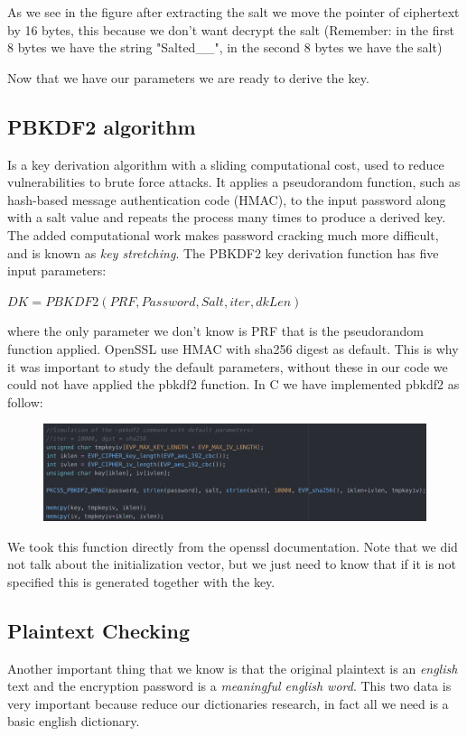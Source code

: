\documentclass[11pt]{article}
\begin{document}
As we see in the figure after extracting the salt we move the pointer of ciphertext by 16 bytes, this because we don't want decrypt the salt (Remember: in the first 8 bytes we have the string "Salted\_\_", in the second 8 bytes we have the salt)

Now that we have our parameters we are ready to derive the key.

\subsection{PBKDF2 algorithm}
Is a key derivation algorithm with a sliding computational cost, used to reduce vulnerabilities to brute force attacks. It applies a pseudorandom function,  such as hash-based message authentication code (HMAC), to the input password along with a salt value and repeats the process many times to produce a derived key. The added computational work makes password cracking much more difficult, and is known as {\em key stretching}.
The PBKDF2 key derivation function has five input parameters:

\bigskip
$ DK = PBKDF2(PRF, Password, Salt, iter, dkLen) $
\bigskip

where the only parameter we don't know is PRF that is the pseudorandom function applied. OpenSSL use HMAC with sha256 digest as default. This is why it was important to study the default parameters, without these in our code we could not have applied the pbkdf2 function. In C we have implemented pbkdf2 as follow:

\begin{figure}[!ht]
  \includegraphics[width=1\textwidth]{pic2-hw2-1635747}
  \label{fig:pbkdf2 implementation}
\end{figure}
\newpage

We took this function directly from the openssl documentation. Note that we did not talk about the initialization vector, but we just need to know that if it is not specified this is generated together with the key.

\subsection{Plaintext Checking}
Another important thing that we know is that the original plaintext is an {\em english} text and the encryption password is a {\em meaningful english word}. This two data is very important because reduce our dictionaries research, in fact all we need is a basic english dictionary.
\end{document}
